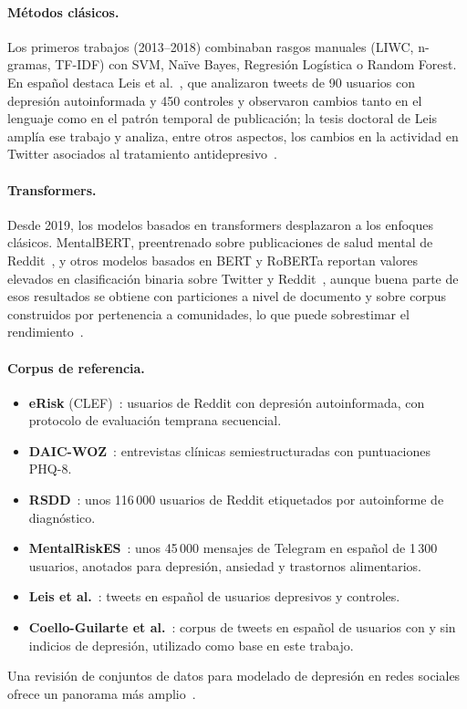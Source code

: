 \documentclass[12pt,a4paper]{article}
\begin{document}
\paragraph{Métodos clásicos.} Los primeros trabajos (2013--2018) combinaban rasgos manuales (LIWC, n-gramas, TF-IDF) con SVM, Naïve Bayes, Regresión Logística o Random Forest. En español destaca Leis et al.~\cite{leis2019detecting}, que analizaron tweets de 90 usuarios con depresión autoinformada y 450 controles y observaron cambios tanto en el lenguaje como en el patrón temporal de publicación; la tesis doctoral de Leis amplía ese trabajo y analiza, entre otros aspectos, los cambios en la actividad en Twitter asociados al tratamiento antidepresivo~\cite{leis2021tesis}.

\paragraph{Transformers.} Desde 2019, los modelos basados en transformers desplazaron a los enfoques clásicos. MentalBERT, preentrenado sobre publicaciones de salud mental de Reddit~\cite{ji2022mentalbert}, y otros modelos basados en BERT y RoBERTa reportan valores elevados en clasificación binaria sobre Twitter y Reddit~\cite{halimeh2023transformers,mao2025transformer,wan2025depression}, aunque buena parte de esos resultados se obtiene con particiones a nivel de documento y sobre corpus construidos por pertenencia a comunidades, lo que puede sobrestimar el rendimiento~\cite{harrigian2020generalize}.

\paragraph{Corpus de referencia.}
\begin{itemize}[leftmargin=2em]
    \item \textbf{eRisk} (CLEF)~\cite{losada2017erisk}: usuarios de Reddit con depresión autoinformada, con protocolo de evaluación temprana secuencial.
    \item \textbf{DAIC-WOZ}~\cite{gratch2014daic}: entrevistas clínicas semiestructuradas con puntuaciones PHQ-8.
    \item \textbf{RSDD}~\cite{yates2017rsdd}: unos 116\,000 usuarios de Reddit etiquetados por autoinforme de diagnóstico.
    \item \textbf{MentalRiskES}~\cite{marmol2024mentalriskes,marmol2023overview}: unos 45\,000 mensajes de Telegram en español de 1\,300 usuarios, anotados para depresión, ansiedad y trastornos alimentarios.
    \item \textbf{Leis et al.}~\cite{leis2019detecting}: tweets en español de usuarios depresivos y controles.
    \item \textbf{Coello-Guilarte et al.}~\cite{coello2019}: corpus de tweets en español de usuarios con y sin indicios de depresión, utilizado como base en este trabajo.
\end{itemize}
Una revisión de conjuntos de datos para modelado de depresión en redes sociales ofrece un panorama más amplio~\cite{bucur2025datasets}.
\end{document}
